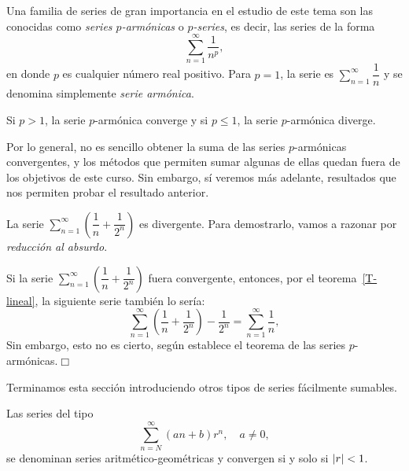 
Una familia de series de gran importancia en el estudio de este tema son las conocidas como \emph{series $p$-armónicas} o \emph{$p$-series}, es decir, las series de la forma
\[
\displaystyle\sum_{n=1}^\infty  \dfrac{1}{n^p},
\]
en donde $p$ es cualquier número real positivo.
Para $p=1$, la serie es $\displaystyle\sum_{n=1}^\infty  \dfrac{1}{n}$ y se denomina simplemente \emph{serie armónica}.
%
\begin{teorema}\label{teo:armonica}
Si $p>1$, la serie $p$-armónica converge y si $p\le 1$, la serie $p$-armónica diverge.
\end{teorema}

Por lo general, no es sencillo obtener la suma de las series $p$-armónicas convergentes, y los métodos que permiten sumar algunas de ellas quedan fuera de los objetivos de este curso.
Sin embargo, sí veremos más adelante, resultados que nos permiten probar el resultado anterior.

\begin{ejemplo}
La serie $\displaystyle\sum_{n=1}^\infty  \left(\dfrac1n+\dfrac1{2^n}\right)$ es divergente.
Para demostrarlo, vamos a razonar por \emph{reducción al absurdo}.

Si la serie $\displaystyle\sum_{n=1}^\infty  \left(\dfrac1n+\dfrac1{2^n}\right)$ fuera convergente, entonces, por el teorema~\ref{T-lineal}, la siguiente serie también lo sería:
\[
\displaystyle\sum_{n=1}^\infty  \left(\dfrac1n+\dfrac1{2^n}\right)-\dfrac1{2^n} = \displaystyle\sum_{n=1}^\infty  \dfrac1n,
\]
Sin embargo, esto no es cierto, según establece el teorema de las series $p$-armónicas.\hfill$\Box$
\end{ejemplo}

Terminamos esta sección introduciendo otros tipos de series fácilmente sumables.

\begin{teorema} Las series del tipo  
\[
\displaystyle\sum_{n=N}^\infty(an+b)r^n,\quad a\ne0,
\]
se denominan series aritmético-geométricas y convergen si y solo si $|r|< 1$.
\end{teorema}

